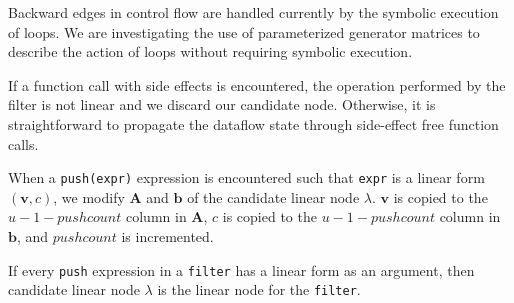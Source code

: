 Backward edges in control flow are handled currently by the symbolic
execution of loops. We are investigating the use of parameterized
generator matrices to describe the action of loops without requiring
symbolic execution.

If a function call with side effects is encountered, the operation
performed by the filter is not linear and we discard our candidate
node. Otherwise, it is straightforward to propagate the dataflow state
through side-effect free function calls.

When a {\tt push(expr)} expression is encountered such that {\tt expr}
is a linear form $({\mathbf v},c)$, we modify ${\mathbf A}$ and
${\mathbf b}$ of the candidate linear node $\lambda$.  ${\mathbf v}$
is copied to the $u-1-pushcount$ column in ${\mathbf A}$, $c$ is
copied to the $u-1-pushcount$ column in ${\mathbf b}$, and $pushcount$
is incremented.

If every {\tt push} expression in a {\tt filter} has a linear form as
an argument, then candidate linear node $\lambda$ is the linear node
for the {\tt filter}.
